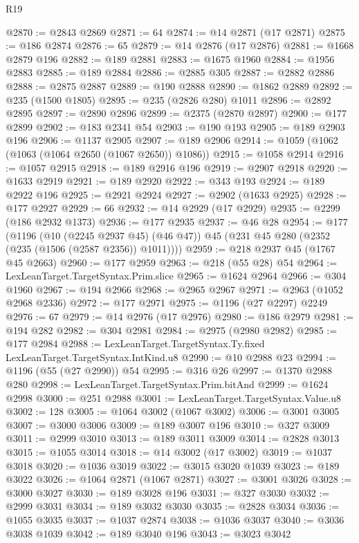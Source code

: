\begin{lexlean}{R19}
\begin{coremodule}
@2870 := @2843 @2869
@2871 := 64
@2874 := @14 @2871 (@17 @2871)
@2875 := @186 @2874
@2876 := 65
@2879 := @14 @2876 (@17 @2876)
@2881 := @1668 @2879 @196
@2882 := @189 @2881
@2883 := @1675 @1960
@2884 := @1956 @2883
@2885 := @189 @2884
@2886 := @2885 @305
@2887 := @2882 @2886
@2888 := @2875 @2887
@2889 := @190 @2888
@2890 := @1862 @2889
@2892 := @235 (@1500 @1805)
@2895 := @235 (@2826 @280) @1011
@2896 := @2892 @2895
@2897 := @2890 @2896
@2899 := @2375 (@2870 @2897)
@2900 := @177 @2899
@2902 := @183 @2341 @54
@2903 := @190 @193
@2905 := @189 @2903 @196
@2906 := @1137 @2905
@2907 := @189 @2906
@2914 := @1059 (@1062 (@1063 (@1064 @2650 (@1067 @2650)) @1086))
@2915 := @1058 @2914
@2916 := @1057 @2915
@2918 := @189 @2916 @196
@2919 := @2907 @2918
@2920 := @1633 @2919
@2921 := @189 @2920
@2922 := @343 @193
@2924 := @189 @2922 @196
@2925 := @2921 @2924
@2927 := @2902 (@1633 @2925)
@2928 := @177 @2927
@2929 := 66
@2932 := @14 @2929 (@17 @2929)
@2935 := @2299 (@186 @2932 @1373)
@2936 := @177 @2935
@2937 := @46 @28
@2954 := @177
    (@1196
      (@10 (@2245 @2937 @45) (@46 @47))
      @45
      (@231 @45 @280 (@2352 (@235 (@1506 (@2587 @2356)) @1011))))
@2959 := @218 @2937 @45 (@1767 @45 @2663)
@2960 := @177 @2959
@2963 := @218 (@55 @28) @54
@2964 := LexLeanTarget.TargetSyntax.Prim.slice
@2965 := @1624 @2964
@2966 := @304 @1960
@2967 := @194 @2966
@2968 := @2965 @2967
@2971 := @2963 (@1052 @2968 @2336)
@2972 := @177 @2971
@2975 := @1196 (@27 @2297) @2249
@2976 := 67
@2979 := @14 @2976 (@17 @2976)
@2980 := @186 @2979
@2981 := @194 @282
@2982 := @304 @2981
@2984 := @2975 (@2980 @2982)
@2985 := @177 @2984
@2988 := LexLeanTarget.TargetSyntax.Ty.fixed LexLeanTarget.TargetSyntax.IntKind.u8
@2990 := @10 @2988 @23
@2994 := @1196 (@55 (@27 @2990)) @54
@2995 := @316 @26
@2997 := @1370 @2988 @280
@2998 := LexLeanTarget.TargetSyntax.Prim.bitAnd
@2999 := @1624 @2998
@3000 := @251 @2988
@3001 := LexLeanTarget.TargetSyntax.Value.u8
@3002 := 128
@3005 := @1064 @3002 (@1067 @3002)
@3006 := @3001 @3005
@3007 := @3000 @3006
@3009 := @189 @3007 @196
@3010 := @327 @3009
@3011 := @2999 @3010
@3013 := @189 @3011 @3009
@3014 := @2828 @3013
@3015 := @1055 @3014
@3018 := @14 @3002 (@17 @3002)
@3019 := @1037 @3018
@3020 := @1036 @3019
@3022 := @3015 @3020 @1039
@3023 := @189 @3022
@3026 := @1064 @2871 (@1067 @2871)
@3027 := @3001 @3026
@3028 := @3000 @3027
@3030 := @189 @3028 @196
@3031 := @327 @3030
@3032 := @2999 @3031
@3034 := @189 @3032 @3030
@3035 := @2828 @3034
@3036 := @1055 @3035
@3037 := @1037 @2874
@3038 := @1036 @3037
@3040 := @3036 @3038 @1039
@3042 := @189 @3040 @196
@3043 := @3023 @3042

\end{coremodule}
\end{lexlean}
